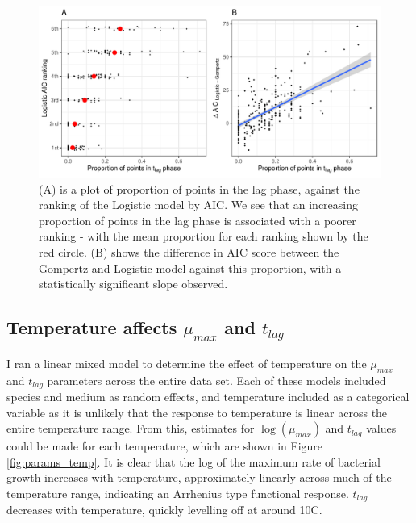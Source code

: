 \documentclass[11pt, a4paper]{article}
\begin{document}
\begin{linenumbers}
                \begin{figure}[H]
        \includegraphics[width=\linewidth]{../results/tlag_vs_logistic.pdf}
        \caption{(A) is a plot of proportion of points in the lag phase, against the ranking of the Logistic model by AIC. We see that an increasing proportion of points in the lag phase is associated with a poorer ranking - with the mean proportion for each ranking shown by the red circle. (B) shows the difference in AIC score between the Gompertz and Logistic model against this proportion, with a statistically significant slope observed.}
        \label{fig:logistic_tlag}
        \end{figure}        
        
        \subsection{Temperature affects $\mu_{max}$ and $t_{lag}$}
        
         I ran a linear mixed model to determine the effect of temperature on the $\mu_{max}$ and $t_{lag}$ parameters across the entire data set. Each of these models included species and medium as random effects, and temperature included as a categorical variable as it is unlikely that the response to temperature is linear across the entire temperature range. From this, estimates for $\log(\mu_{max})$ and $t_{lag}$ values could be made for each temperature, which are shown in Figure \ref{fig:params_temp}. It is clear that the log of the maximum rate of bacterial growth increases with temperature, approximately linearly across much of the temperature range, indicating an Arrhenius type functional response. $t_{lag}$ decreases with temperature, quickly levelling off at around 10\degree C. 


\end{linenumbers}
\end{document}
